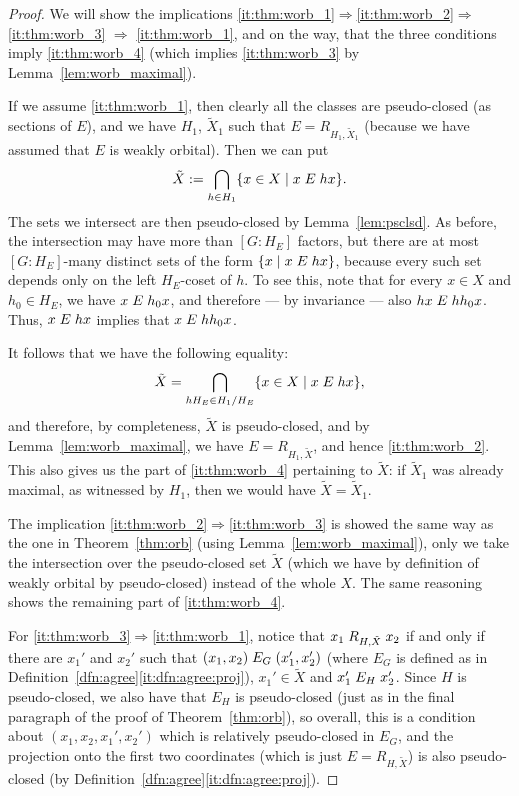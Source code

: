 	\begin{proof}
		We will show the implications \ref{it:thm:worb_1}$\Rightarrow$\ref{it:thm:worb_2}$\Rightarrow$ \ref{it:thm:worb_3} $\Rightarrow$ \ref{it:thm:worb_1}, and on the way, that the three conditions imply \ref{it:thm:worb_4} (which implies \ref{it:thm:worb_3} by Lemma~\ref{lem:worb_maximal}).
		
		If we assume \ref{it:thm:worb_1}, then clearly all the classes are pseudo-closed (as sections of $E$), and we have $H_1$, $\tilde X_1$ such that $E=R_{H_1,\tilde X_1}$ (because we have assumed that $E$ is weakly orbital). Then we can put
		\[
		\tilde X:=\bigcap_{h\in H_1} \{x\in X\mid x\mathrel{E} hx \}.
		\]
		The sets we intersect are then pseudo-closed by Lemma~\ref{lem:psclsd}. As before, the intersection may have more than $[G:H_E]$ factors, but there are at most $[G:H_E]$-many distinct sets of the form $\{x\mid x\mathrel{E} hx \}$, because every such set depends only on the left $H_E$-coset of $h$. To see this, note that for every $x\in X$ and $h_0\in H_E$, we have $x\mathrel{E} h_0 x$, and therefore --- by invariance --- also $hx\mathrel{E} hh_0x$. Thus, $x \mathrel{E} hx$ implies that $x\mathrel{E} hh_0x$.
		
		It follows that we have the following equality:
		\[
		\tilde X=\bigcap_{hH_E\in H_1/H_E} \{x\in X\mid x\mathrel{E} hx \},
		\]
		and therefore, by completeness, $\tilde X$ is pseudo-closed, and by Lemma~\ref{lem:worb_maximal}, we have $E=R_{H_1,\tilde X}$, and hence \ref{it:thm:worb_2}. This also gives us the part of \ref{it:thm:worb_4} pertaining to $\tilde X$: if $\tilde X_1$ was already maximal, as witnessed by $H_1$, then we would have $\tilde X=\tilde X_1$.
		
		The implication \ref{it:thm:worb_2}$\Rightarrow$\ref{it:thm:worb_3} is showed the same way as the one in Theorem~\ref{thm:orb} (using Lemma~\ref{lem:worb_maximal}), only we take the intersection over the pseudo-closed set $\tilde X$ (which we have by definition of weakly orbital by pseudo-closed) instead of the whole $X$. The same reasoning shows the remaining part of \ref{it:thm:worb_4}.
		
		For \ref{it:thm:worb_3}$\Rightarrow$\ref{it:thm:worb_1}, notice that $x_1 \mathrel{R}_{H,\tilde X} x_2$ if and only if there are $x_1'$ and $x_2'$ such that $(x_1,x_2)\mathrel{E}_G (x_1',x_2')$ (where $E_G$ is defined as in Definition~\ref{dfn:agree}\ref{it:dfn:agree:proj}), $x_1'\in \tilde X$ and $x_1' \mathrel{E}_H x_2'$. Since $H$ is pseudo-closed, we also have that $E_H$ is pseudo-closed (just as in the final paragraph of the proof of Theorem~\ref{thm:orb}), so overall, this is a condition about $(x_1,x_2,x_1',x_2')$ which is relatively pseudo-closed in $E_G$, and the projection onto the first two coordinates (which is just $E=R_{H,\tilde X}$) is also pseudo-closed (by Definition~\ref{dfn:agree}\ref{it:dfn:agree:proj}).
	\end{proof}
	
